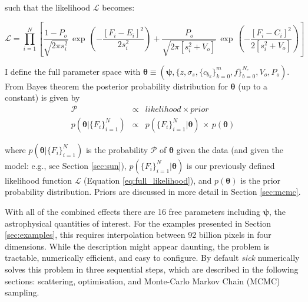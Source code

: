 \documentclass{aastex}
\newcommand{\sick}{\textit{sick}}
\begin{document}
\noindent{}such that the likelihood $\mathcal{L}$ becomes:

\begin{equation}
\mathcal{L} = \prod_{i=1}^{N} \left[ \frac{1-P_o}{\sqrt{2\pi{}s_{i}^2}}\,\exp\,\left(-\frac{[F_i - E_i]^2}{2s_{i}^{2}}\right) + \frac{P_o}{\sqrt{2\pi\left[s_{i}^2 + V_o\right]}}\,\exp\,\left(-\frac{[F_i - C_i]^2}{2\left[s_{i}^{2} + V_o\right]}\right)\right]
\label{eq:full_likelihood}
\end{equation}

I define the full parameter space with $\bm{\theta} \equiv \left(\bm{\psi},\{z,\sigma_s,\{c_{b_k}\}_{k=0}^{m},f\}_{b=0}^{N_{c}},V_o,P_o\right)$. From Bayes theorem the posterior probability 
distribution for $\bm{\theta}$ (up to a constant) is given by
\begin{eqnarray}
\mathcal{P} & \propto & likelihood \times prior \nonumber \\
p(\bm{\theta}|\{F_i\}_{i=1}^{N}) & \propto & p(\{F_i\}_{i=1}^{N}|\bm{\theta})\,\times\,p(\bm{\theta})
\label{eq:probability}
\end{eqnarray}

\noindent{}where $p(\bm{\theta}|\{F_i\}_{i=1}^{N})$ is the probability $\mathcal{P}$ 
of $\bm{\theta}$ given the data (and given the model: e.g., see Section \ref{sec:sun}), 
$p(\{F_i\}_{i=1}^{N}|\bm{\theta})$ is our previously defined likelihood function 
$\mathcal{L}$ (Equation \ref{eq:full_likelihood}), and $p(\bm{\theta})$ is the prior 
probability distribution. Priors are discussed in more detail in Section \ref{sec:mcmc}. 


With all of the combined effects there are 16 free parameters including $\bm{\psi}$, 
the astrophysical quantities of interest. For the examples presented in Section 
\ref{sec:examples}, this requires interpolation between 92 billion pixels in four 
dimensions. While the description might appear daunting, the problem is tractable, 
numerically efficient, and easy to configure. By default \sick{} numerically solves 
this problem in three sequential steps, which are described in the following 
sections: scattering, optimisation, and Monte-Carlo Markov Chain (MCMC) sampling.
\end{document}
